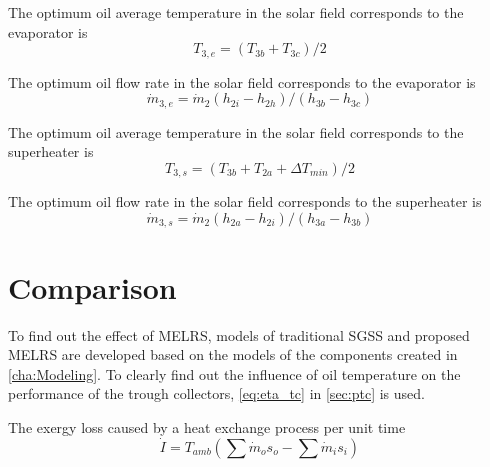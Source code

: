 The optimum oil average temperature in the solar field corresponds to the evaporator is
\begin{equation}
  T_{3,e} = (T_{3b} + T_{3c})/2
\end{equation}

The optimum oil flow rate in the solar field corresponds to the evaporator is
\begin{equation}
  \dot{m}_{3,e} = \dot{m}_{2}(h_{2i} - h_{2h})/(h_{3b} - h_{3c})
  \label{eq:m_3e}
\end{equation}

The optimum oil average temperature in the solar field corresponds to the superheater is
\begin{equation}
  T_{3,s} = (T_{3b} + T_{2a} + \Delta T_{min})/2
\end{equation}

The optimum oil flow rate in the solar field corresponds to the superheater is
\begin{equation}
  \dot{m}_{3,s} = \dot{m}_{2}(h_{2a} - h_{2i})/(h_{3a} - h_{3b})
\end{equation}

\section{Comparison}

To find out the effect of MELRS, models of traditional SGSS and proposed MELRS are developed based on the models of the components created in \autoref{cha:Modeling}. 
To clearly find out the influence of oil temperature on the performance of the trough collectors, \autoref{eq:eta_tc} in \autoref{sec:ptc} is used.

The exergy loss caused by a heat exchange process per unit time
\begin{equation}
  \dot{I} = T_{amb} (\sum \dot{m}_os_o - \sum \dot{m}_is_i)
  \label{eq:dot_I}
\end{equation}

